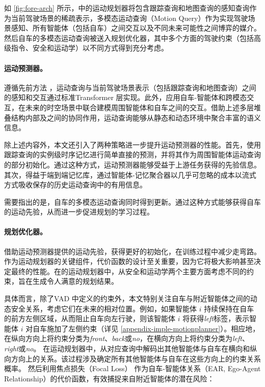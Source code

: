 

如 \cref{fig:fore-arch} 所示，\model 中的运动规划器将包含跟踪查询和地图查询的感知查询作为当前驾驶场景的稀疏表示，多模态运动查询（Motion Query）作为实现驾驶场景感知、所有智能体（包括自车）之间交互以及不同未来可能性之间博弈的媒介。然后自车的多模态运动查询被送入规划优化器，其中多个方面的驾驶约束（包括高级指令、安全和运动学）以不同方式得到充分考虑。

\paragraph{\textbf{运动预测器。}} 遵循先前方法 \cite{hu2023planning, ye2023fusionad}，运动查询与当前驾驶场景表示（包括跟踪查询和地图查询）之间的感知和交互通过标准Transformer \cite{vaswani2017attention} 层实现。此外，应用自车-智能体和跨模态交互，在未来的时空场景中联合建模周围智能体和自车之间的交互。借助上述多层堆叠结构内部及之间的协同作用，运动查询能够从静态和动态环境中聚合丰富的语义信息。

除上述内容外，本文还引入了两种策略进一步提升运动预测器的性能。首先，使用跟踪查询的实例级时序记忆进行简单直接的预测，并将其作为周围智能体运动查询的部分初始化。通过这种方式，运动预测器能够受益于上游任务获得的先验信息。其次，得益于端到端记忆库，通过智能体-记忆聚合器以几乎可忽略的成本以流式方式吸收保存的历史运动查询中的有用信息。

需要指出的是，自车的多模态运动查询同时得到更新。通过这种方式能够获得自车的运动先验，从而进一步促进规划的学习过程。

\paragraph{\textbf{规划优化器。}} 借助运动预测器提供的运动先验，获得更好的初始化，在训练过程中减少走弯路。作为运动规划器的关键组件，代价函数的设计至关重要，因为它将极大影响甚至决定最终的性能。在\model 的运动规划器中，从安全和运动学两个主要方面考虑不同的约束，旨在生成令人满意的规划结果。

具体而言，除了VAD\cite{jiang2023vad} 中定义的约束外，本文特别关注自车与附近智能体之间的动态安全关系，考虑它们在未来的相对位置。例如，如果智能体 $i$ 持续保持在自车的前方左侧区域，从而阻止自车向左行驶，则该智能体 $i$ 将获得\textit{left}标签，表示智能体 $i$ 对自车施加了左侧约束（详见 \cref{appendix-imple-motionplanner}）。相应地，在纵向方向上将约束分类为\textit{front}、\textit{back}或\textit{no}，在横向方向上将约束分类为\textit{left}、\textit{right}或\textit{no}。
在运动规划器中，从对应查询中解码出其他智能体与自车在横向和纵向方向上的关系。该过程涉及确定所有其他智能体与自车在这些方向上的约束关系概率。
然后利用焦点损失（Focal Loss）\cite{lin2017focal} 作为自车-智能体关系（EAR, Ego-Agent Relationship）的代价函数，有效捕捉来自附近智能体的潜在风险：

